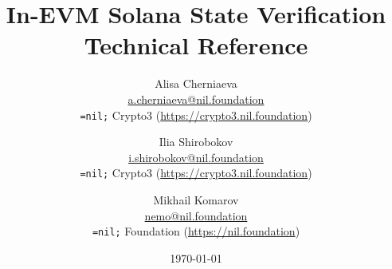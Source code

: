 \setlength{\droptitle}{-4\baselineskip} %

\pretitle{\begin{center}\Huge\bfseries} %
\title{In-EVM Solana State Verification \\[1ex] \large Technical Reference} %
\posttitle{\end{center}} %
\author{ %
	\protect\begin{tabular}{c} \normalsize Alisa Cherniaeva \\
	    \normalsize \href{mailto:a.cherniaeva@nil.foundation}{a.cherniaeva@nil.foundation} \\
	    \normalsize \texttt{=nil;} Crypto3 (\url{https://crypto3.nil.foundation})\\ 
	\protect\end{tabular}
	\and
	\protect\begin{tabular}{c} \normalsize Ilia Shirobokov \\
	    \normalsize \href{mailto:i.shirobokov@nil.foundation}{i.shirobokov@nil.foundation} \\
	    \normalsize \texttt{=nil;} Crypto3 (\url{https://crypto3.nil.foundation})\\ 
	\protect\end{tabular}
    \and
    \protect\begin{tabular}{c} \normalsize Mikhail Komarov \\
	    \normalsize \href{mailto:nemo@nil.foundation}{nemo@nil.foundation} \\
	    \normalsize \texttt{=nil;} Foundation (\url{https://nil.foundation})\\ 
	\protect\end{tabular}
}
\date{\today} %
